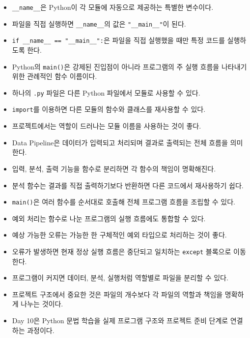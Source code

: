 \documentclass[11pt,a4paper]{article}
\begin{document}
\begin{itemize}[leftmargin=1.5em]
    \item \texttt{\_\_name\_\_}은 Python이 각 모듈에 자동으로 제공하는 특별한 변수이다.
    \item 파일을 직접 실행하면 \texttt{\_\_name\_\_}의 값은 \texttt{"\_\_main\_\_"}이 된다.
    \item \texttt{if \_\_name\_\_ == "\_\_main\_\_":}은 파일을 직접 실행했을 때만 특정 코드를 실행하도록 한다.
    \item Python의 \texttt{main()}은 강제된 진입점이 아니라 프로그램의 주 실행 흐름을 나타내기 위한 관례적인 함수 이름이다.
    \item 하나의 \texttt{.py} 파일은 다른 Python 파일에서 모듈로 사용할 수 있다.
    \item \texttt{import}를 이용하면 다른 모듈의 함수와 클래스를 재사용할 수 있다.
    \item 프로젝트에서는 역할이 드러나는 모듈 이름을 사용하는 것이 좋다.
    \item Data Pipeline은 데이터가 입력되고 처리되며 결과로 출력되는 전체 흐름을 의미한다.
    \item 입력, 분석, 출력 기능을 함수로 분리하면 각 함수의 책임이 명확해진다.
    \item 분석 함수는 결과를 직접 출력하기보다 반환하면 다른 코드에서 재사용하기 쉽다.
    \item \texttt{main()}은 여러 함수를 순서대로 호출해 전체 프로그램 흐름을 조립할 수 있다.
    \item 예외 처리는 함수로 나눈 프로그램의 실행 흐름에도 통합할 수 있다.
    \item 예상 가능한 오류는 가능한 한 구체적인 예외 타입으로 처리하는 것이 좋다.
    \item 오류가 발생하면 현재 정상 실행 흐름은 중단되고 일치하는 \texttt{except} 블록으로 이동한다.
    \item 프로그램이 커지면 데이터, 분석, 실행처럼 역할별로 파일을 분리할 수 있다.
    \item 프로젝트 구조에서 중요한 것은 파일의 개수보다 각 파일의 역할과 책임을 명확하게 나누는 것이다.
    \item Day 10은 Python 문법 학습을 실제 프로그램 구조와 프로젝트 준비 단계로 연결하는 과정이다.
\end{itemize}
\end{document}
